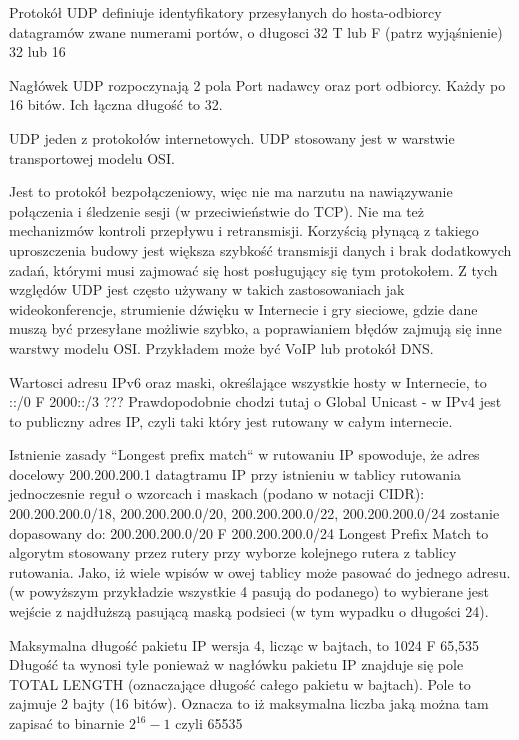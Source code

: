 \answer
{Protokół UDP definiuje identyfikatory przesyłanych do hosta-odbiorcy datagramów
zwane numerami portów, o długosci}
{32}
{T lub F (patrz wyjąśnienie)} %
{32 lub 16 }
{Nagłówek UDP rozpoczynają 2 pola Port nadawcy oraz port odbiorcy. Każdy po 16 bitów. Ich łączna długość to 32.

UDP jeden z protokołów internetowych. UDP stosowany jest w warstwie transportowej modelu OSI.

Jest to protokół bezpołączeniowy, więc nie ma narzutu na nawiązywanie połączenia i śledzenie sesji (w przeciwieństwie do TCP). Nie ma też mechanizmów kontroli przepływu i retransmisji. Korzyścią płynącą z takiego uproszczenia budowy jest większa szybkość transmisji danych i brak dodatkowych zadań, którymi musi zajmować się host posługujący się tym protokołem. Z tych względów UDP jest często używany w takich zastosowaniach jak wideokonferencje, strumienie dźwięku w Internecie i gry sieciowe, gdzie dane muszą być przesyłane możliwie szybko, a poprawianiem błędów zajmują się inne warstwy modelu OSI. Przykładem może być VoIP lub protokół DNS.
}

\answer
{Wartosci adresu IPv6 oraz maski, określające wszystkie hosty w Internecie, to}
{ ::/0}
{F} %
{2000::/3 ???}
{Prawdopodobnie chodzi tutaj o Global Unicast - w IPv4 jest to publiczny adres IP, czyli taki który jest rutowany w całym internecie.}


\answer
{Istnienie zasady “Longest prefix match“ w rutowaniu IP spowoduje, że adres docelowy 200.200.200.1 datagtramu IP przy istnieniu w tablicy rutowania jednoczesnie reguł o wzorcach i maskach (podano w notacji CIDR): 200.200.200.0/18, 200.200.200.0/20, 200.200.200.0/22, 200.200.200.0/24
zostanie dopasowany do:}
{200.200.200.0/20}
{F} %
{200.200.200.0/24}
{Longest Prefix Match to algorytm stosowany przez rutery przy wyborze kolejnego rutera z tablicy rutowania. Jako, iż wiele wpisów w owej tablicy może pasować do jednego adresu. (w powyższym przykładzie wszystkie 4 pasują do podanego) to wybierane jest wejście z najdłuższą pasującą maską podsieci (w tym wypadku o długości 24).}


\answer
{Maksymalna długość pakietu IP wersja 4, licząc w bajtach, to}
{1024}
{F} %
{65,535}
{Długość ta wynosi tyle ponieważ w nagłówku pakietu IP znajduje się pole TOTAL LENGTH (oznaczające długość całego pakietu w bajtach). Pole to zajmuje 2 bajty (16 bitów). Oznacza to iż maksymalna liczba jaką można tam zapisać to binarnie $ 2 ^ 16 -1 $ czyli 65535 }



